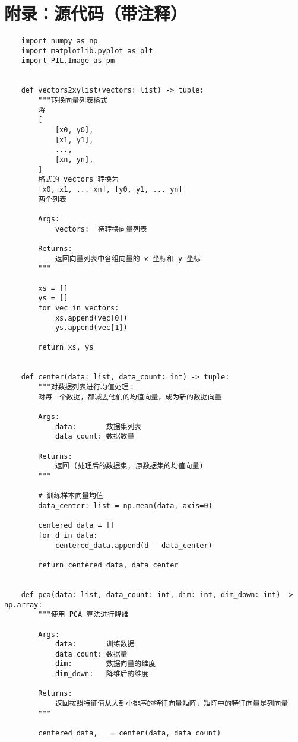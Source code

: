 \appendix

\section{附录：源代码（带注释）}

\begin{verbatim}
    import numpy as np
    import matplotlib.pyplot as plt
    import PIL.Image as pm


    def vectors2xylist(vectors: list) -> tuple:
        """转换向量列表格式
        将
        [
            [x0, y0],
            [x1, y1],
            ...,
            [xn, yn],
        ]
        格式的 vectors 转换为
        [x0, x1, ... xn], [y0, y1, ... yn]
        两个列表

        Args:
            vectors:  待转换向量列表

        Returns:
            返回向量列表中各组向量的 x 坐标和 y 坐标
        """

        xs = []
        ys = []
        for vec in vectors:
            xs.append(vec[0])
            ys.append(vec[1])

        return xs, ys


    def center(data: list, data_count: int) -> tuple:
        """对数据列表进行均值处理：
        对每一个数据，都减去他们的均值向量，成为新的数据向量

        Args:
            data:       数据集列表
            data_count: 数据数量

        Returns:
            返回 (处理后的数据集, 原数据集的均值向量)
        """

        # 训练样本向量均值
        data_center: list = np.mean(data, axis=0)

        centered_data = []
        for d in data:
            centered_data.append(d - data_center)

        return centered_data, data_center


    def pca(data: list, data_count: int, dim: int, dim_down: int) -> np.array:
        """使用 PCA 算法进行降维

        Args:
            data:       训练数据
            data_count: 数据量
            dim:        数据向量的维度
            dim_down:   降维后的维度

        Returns:
            返回按照特征值从大到小排序的特征向量矩阵，矩阵中的特征向量是列向量
        """

        centered_data, _ = center(data, data_count)


\end{verbatim}
